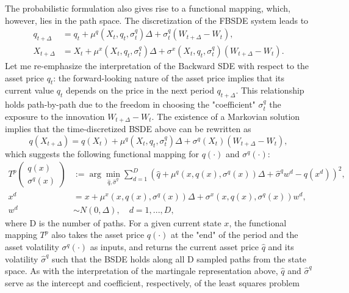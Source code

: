 \documentclass{article}
\begin{document}
The probabilistic formulation also gives rise to a functional mapping, which, however, lies in the path space. The discretization of the FBSDE system leads to
\begin{align*}
q_{t+\Delta}&=q_{t}+\mu^{q}(X_{t},q_{t},\sigma_{t}^{q})\Delta+\sigma_{t}^{q}(W_{t+\Delta}-W_{t}), \\
X_{t+\Delta}&=X_{t}+\mu^{x}(X_{t},q_{t},\sigma_{t}^{q})\Delta+\sigma^{x}(X_{t},q_{t},\sigma_{t}^{q})(W_{t+\Delta}-W_{t}).
\end{align*}
Let me re-emphasize the interpretation of the Backward SDE with respect to the asset price $q_{t}$: the forward-looking nature of the asset price implies that its current value $q_{t}$ depends on the price in the next period $q_{t+\Delta}$. This relationship holds path-by-path due to the freedom in choosing the "coefficient" $\sigma_{t}^{q}$ the exposure to the innovation $W_{t+\Delta}-W_{t}$. The existence of a Markovian solution implies that the time-discretized BSDE above can be rewritten as
\[
q(X_{t+\Delta})=q(X_{t})+\mu^{q}(X_{t},q_{t},\sigma_{t}^{q})\Delta+\sigma^{q}(X_{t})(W_{t+\Delta}-W_{t}),
\]
which suggests the following functional mapping for $q(\cdot)$ and $\sigma^{q}(\cdot)$:
\begin{equation}
\begin{aligned}
T^{p}\begin{pmatrix}q(x)\\ \sigma^{q}(x)\end{pmatrix}&:=\arg\min_{\hat{q},\hat{\sigma}^{q}}\sum_{d=1}^{D}(\hat{q}+\mu^{q}(x,q(x),\sigma^{q}(x))\Delta+\hat{\sigma}^{q}w^{d}-q(x^{d}))^{2}, \\
x^{d}&=x+\mu^{x}(x,q(x),\sigma^{q}(x))\Delta+\sigma^{x}(x,q(x),\sigma^{q}(x))w^{d}, \\
w^{d}&\sim N(0,\Delta), \quad d=1,...,D,
\end{aligned}
\label{eq:15}
\end{equation}
where D is the number of paths. For a given current state $x$, the functional mapping $T^{p}$ also takes the asset price $q(\cdot)$ at the "end" of the period and the asset volatility $\sigma^{q}(\cdot)$ as inputs, and returns the current asset price $\hat{q}$ and its volatility $\hat{\sigma}^{q}$ such that the BSDE holds along all D sampled paths from the state space. As with the interpretation of the martingale representation above, $\hat{q}$ and $\hat{\sigma}^{q}$ serve as the intercept and coefficient, respectively, of the least squares problem

\clearpage
\end{document}
